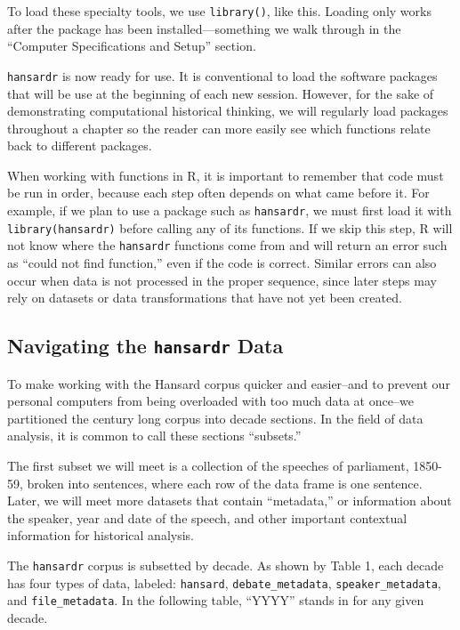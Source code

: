 \documentclass[
]{article}
\newcounter{chapter}
\begin{document}
To load these specialty tools, we use \texttt{library()}, like this.
Loading only works after the package has been installed---something we
walk through in the ``Computer Specifications and Setup'' section.

\texttt{hansardr} is now ready for use. It is conventional to load the
software packages that will be use at the beginning of each new session.
However, for the sake of demonstrating computational historical
thinking, we will regularly load packages throughout a chapter so the
reader can more easily see which functions relate back to different
packages.

When working with functions in R, it is important to remember that code
must be run in order, because each step often depends on what came
before it. For example, if we plan to use a package such as
\texttt{hansardr}, we must first load it with \texttt{library(hansardr)}
before calling any of its functions. If we skip this step, R will not
know where the \texttt{hansardr} functions come from and will return an
error such as ``could not find function,'' even if the code is correct.
Similar errors can also occur when data is not processed in the proper
sequence, since later steps may rely on datasets or data transformations
that have not yet been created.

\subsection{\texorpdfstring{Navigating the \texttt{hansardr}
Data}{Navigating the hansardr Data}}\label{navigating-the-hansardr-data}

To make working with the Hansard corpus quicker and easier--and to
prevent our personal computers from being overloaded with too much data
at once--we partitioned the century long corpus into decade sections. In
the field of data analysis, it is common to call these sections
``subsets.''

The first subset we will meet is a collection of the speeches of
parliament, 1850-59, broken into sentences, where each row of the data
frame is one sentence. Later, we will meet more datasets that contain
``metadata,'' or information about the speaker, year and date of the
speech, and other important contextual information for historical
analysis.

The \texttt{hansardr} corpus is subsetted by decade. As shown by Table
1, each decade has four types of data, labeled: \texttt{hansard},
\texttt{debate\_metadata}, \texttt{speaker\_metadata}, and
\texttt{file\_metadata}. In the following table, ``YYYY'' stands in for
any given decade.
\end{document}
